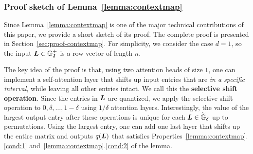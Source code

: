 \vspace*{-3pt}
\subsubsection{Proof sketch of Lemma~\ref{lemma:contextmap}}
\vspace*{-3pt}
Since Lemma~\ref{lemma:contextmap} is one of the major technical contributions of this paper, we provide a short sketch of its proof. The complete proof is presented in Section~\ref{sec:proof-contextmap}.
For simplicity, we consider the case $d = 1$, so the input ${\bm{L}} \in {\mathbb{G}}^+_{\delta}$ is a row vector of length $n$. 

The key idea of the proof is that, using two attention heads of size $1$, one can implement a self-attention layer that shifts up input entries that are \emph{in a specific interval}, while leaving all other entries intact. We call this the \textbf{selective shift operation}. Since the entries in ${\bm{L}}$ are quantized, we apply the selective shift operation to $0, \delta, \dots, 1-\delta$ using $1/\delta$ attention layers. Interestingly, the value of the largest output entry after these operations is unique for each ${\bm{L}} \in \widetilde{{\mathbb{G}}}_{\delta}$ up to permutations. Using the largest entry, one can add one last layer that shifts up the entire matrix and outputs $q({\bm{L}})$ that satisfies Properties~\ref{lemma:contextmap}.\ref{cond:1} and~\ref{lemma:contextmap}.\ref{cond:2} of the lemma.

